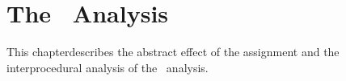 \chapter{The \cpo\ Analysis}

This chapterdescribes the abstract effect of the assignment and the interprocedural analysis of the \cpo\ analysis.




